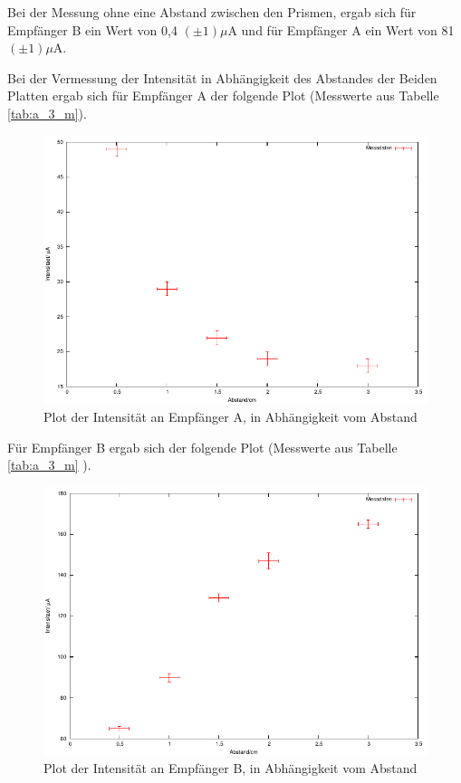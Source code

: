 \documentclass[12pt]{scrartcl}
\begin{document}
Bei der Messung ohne eine Abstand zwischen den Prismen, ergab sich für Empfänger B ein Wert von 0,4 $(\pm 1) \mu$A und für Empfänger A ein Wert von 81 $(\pm 1) \mu$A.

Bei der Vermessung der Intensität in Abhängigkeit des Abstandes der Beiden Platten ergab sich für Empfänger A der folgende Plot (Messwerte aus Tabelle \ref{tab:a_3_m}).

\begin{figure}[H]
\centering
    \includegraphics[scale = 1]{a_3_A.pdf}
  	\caption[Plot der Intensität an Empfänger A, in Abhängigkeit vom Abstand]{Plot der Intensität an Empfänger A, in Abhängigkeit vom Abstand}
  \label{fig:a_3_A}
\end{figure}

Für Empfänger B ergab sich der folgende Plot (Messwerte aus Tabelle \ref{tab:a_3_m} ).

\begin{figure}[H]
\centering
    \includegraphics[scale = 1]{a_3_B.pdf}
  	\caption[Plot der Intensität an Empfänger B, in Abhängigkeit vom Abstand]{Plot der Intensität an Empfänger B, in Abhängigkeit vom Abstand}
  \label{fig:a_3_B}
\end{figure}
\end{document}
